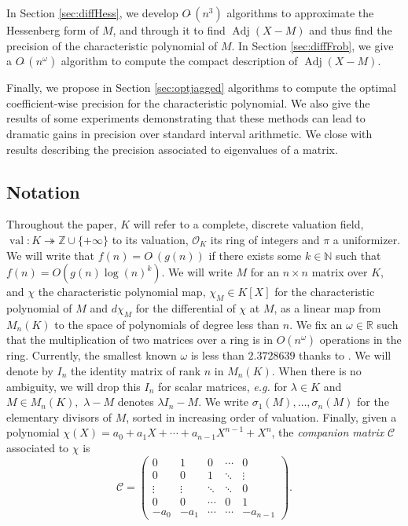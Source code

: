 \documentclass{sig-alternate-05-2015}
\DeclareMathOperator{\val}{val}
\DeclareMathOperator{\adj}{Adj}
\newcommand{\Z}{\mathbb Z}
\newcommand{\R}{\mathbb R}
\newcommand{\OK}{\mathcal{O}_K}
\newcommand{\softO}{O\tilde{~}}
\begin{document}
In Section \ref{sec:diffHess}, we develop $\softO(n^3)$ algorithms to approximate
the Hessenberg form of $M$, and through it to find $\adj(X-M)$ and thus
find the precision of the characteristic polynomial of $M$.  In Section \ref{sec:diffFrob},
we give a $\softO(n^\omega)$ algorithm to compute the compact description of $\adj(X-M)$.

Finally, we propose in Section \ref{sec:optjagged}
algorithms to compute the optimal coefficient-wise precision
for the characteristic polynomial.  We also give the results
of some experiments demonstrating that these methods can lead
to dramatic gains in precision over standard interval arithmetic.
We close with results describing the precision associated to
eigenvalues of a matrix.

\subsection*{Notation} Throughout the paper, $K$ will refer to a complete,
discrete valuation field, $\val : K \twoheadrightarrow \Z \cup \{+\infty\}$ to its valuation,
$\OK$ its ring of integers and $\pi$ a uniformizer. 
We will write that $f(n)=\softO (g(n))$ if there exists some
$k \in \mathbb{N}$ such that $f(n)=O(g(n) \log (n)^k).$
We will write $M$ for an $n \times n$ matrix over $K$,
and $\chi$ the characteristic polynomial map, $\chi_M \in K[X]$ for
the characteristic polynomial of $M$ and $d\chi_M$ for the differential
of $\chi$ at $M$, as a linear map from $M_n(K)$ to the space
of polynomials of degree less than $n$.
We fix an $\omega \in \R$ such that the multiplication
of two matrices over a ring is in $O(n^\omega)$ operations in the
ring. Currently, the smallest known $\omega$ is less than
$2.3728639 $ thanks to \cite{legall:14a}. 
We will denote by $I_n$ the identity matrix of rank $n$ in $M_n(K).$
When there is no ambiguity, we will drop this $I_n$
for scalar matrices, \textit{e.g.} for $\lambda \in K$
and $M \in M_n (K),$ $\lambda-M$ denotes $\lambda I_n - M.$
We write $\sigma_1(M), \dots, \sigma_n(M)$ for the
elementary divisors of $M$, sorted in increasing order of valuation.
Finally, given a polynomial $\chi(X) = a_0 + a_1 X + \cdots + a_{n-1} X^{n-1} + X^n$,
the \emph{companion matrix} $\mathscr{C}$ associated to $\chi$ is
\begin{equation}
\label{eq:companion}
\mathscr{C} = \left( \begin{matrix}
0 & 1 & 0 & \cdots & 0 \\
0 & 0 & 1 & \ddots & \vdots \\
\vdots & \vdots & \ddots & \ddots & 0 \\
0 & 0 & \cdots & 0 & 1 \\
-a_0 & -a_1 & \cdots & \cdots & -a_{n-1}
\end{matrix} \right).
\end{equation}
\end{document}
